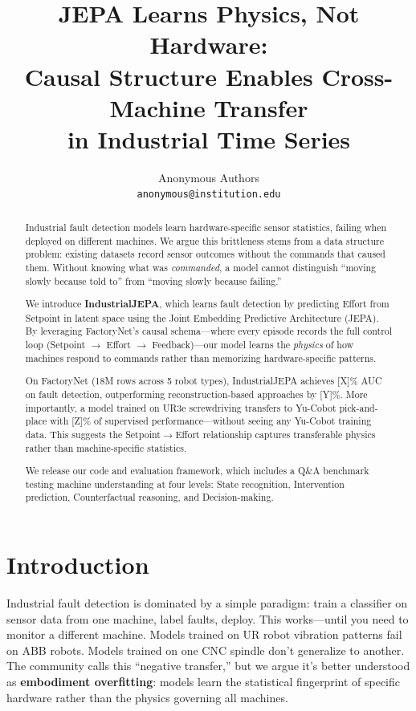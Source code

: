 \documentclass{article}
\title{\textbf{JEPA Learns Physics, Not Hardware:\\Causal Structure Enables Cross-Machine Transfer\\in Industrial Time Series}}
\author{
  Anonymous Authors\\
  \texttt{anonymous@institution.edu}
}
\date{}
\begin{document}
\maketitle

\begin{abstract}
Industrial fault detection models learn hardware-specific sensor statistics, failing when deployed on different machines. We argue this brittleness stems from a data structure problem: existing datasets record sensor outcomes without the commands that caused them. Without knowing what was \emph{commanded}, a model cannot distinguish ``moving slowly because told to'' from ``moving slowly because failing.''

We introduce \textbf{IndustrialJEPA}, which learns fault detection by predicting Effort from Setpoint in latent space using the Joint Embedding Predictive Architecture (JEPA). By leveraging FactoryNet's causal schema—where every episode records the full control loop (Setpoint $\rightarrow$ Effort $\rightarrow$ Feedback)—our model learns the \emph{physics} of how machines respond to commands rather than memorizing hardware-specific patterns.

On FactoryNet (18M rows across 5 robot types), IndustrialJEPA achieves [X]\% AUC on fault detection, outperforming reconstruction-based approaches by [Y]\%. More importantly, a model trained on UR3e screwdriving transfers to Yu-Cobot pick-and-place with [Z]\% of supervised performance—without seeing any Yu-Cobot training data. This suggests the Setpoint$\rightarrow$Effort relationship captures transferable physics rather than machine-specific statistics.

We release our code and evaluation framework, which includes a Q\&A benchmark testing machine understanding at four levels: State recognition, Intervention prediction, Counterfactual reasoning, and Decision-making.
\end{abstract}

\section{Introduction}

Industrial fault detection is dominated by a simple paradigm: train a classifier on sensor data from one machine, label faults, deploy. This works—until you need to monitor a different machine. Models trained on UR robot vibration patterns fail on ABB robots. Models trained on one CNC spindle don't generalize to another. The community calls this ``negative transfer,'' but we argue it's better understood as \textbf{embodiment overfitting}: models learn the statistical fingerprint of specific hardware rather than the physics governing all machines.
\end{document}
